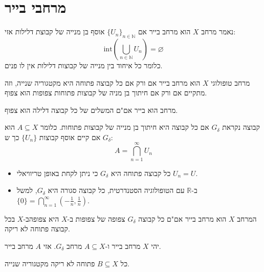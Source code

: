 \documentclass{tstextbook}
\begin{document}
\section{מרחבי בייר}

\begin{definition}
נאמר מרחב \(X\) הוא מרחב בייר אם  \(\{ U_{n} \}_{n \in \mathbb{N}}\) אוסף בן מנייה של קבוצת דלילות אזי:
$$\mathrm{int}\left( \bigcup_{n\in \mathbb{N}}U_{n} \right)=\varnothing $$
כלומר כל איחוד בין מנייה של קבוצות דלילות אין לו פנים.

\end{definition}
\begin{proposition}
מרחב טופולוגי \(X\) הוא מרחב בייר אם ורק אם כל קבוצה פתוחה היא מקטגוריה שנייה, וזה מתקיים אם ורק אם חיתוך בן מניה של קבוצות פתוחות צפופות הוא צפוף.

\end{proposition}
\begin{corollary}
מרחב הוא בייר אם"ם המשלים של כל קבוצה דלילה הוא צפוף.

\end{corollary}
\begin{definition}
קבוצה נקראת \(G_{\delta}\) אם כל קבוצה היא חיתוך בן מנייה של קבוצות פתוחות. כלומר \(A\subseteq X\) הוא \(G_{\delta}\) אם קיים אוסף קבוצות \(\{ U_{n} \}\) כך ש:
$$A=\bigcap_{n=1}^{\infty} U_{n}$$

\end{definition}
\begin{example}
  \begin{itemize}
    \item כל קבוצה פתוחה היא \(G_{\delta}\) כי ניתן לקחת באופן טריוויאלי \(U_{n}=U\).
    \item ב-\(\mathbb{R}\) עם הטופולוגיה הסטנדרטית, כל קבוצה סגורה היא \(G_{\delta}\), למשל \(\{ 0 \}=\bigcap_{n=1}^{\infty}\left( -\frac{1}{n},\frac{1}{n} \right)\).
  \end{itemize}
\end{example}
\begin{corollary}
המרחב \(X\) הוא מרחב בייר אם"ם כל קבוצה \(G_{\delta}\) צפופה של צפופות ב-\(X\) היא צפופהב-\(X\) בכל קבוצה פתוחה לא ריקה. 

\end{corollary}
\begin{proposition}
יהי \(X\) מרחב בייר ו-\(A\subseteq X\) מרחב \(G_{\delta}\). אזי \(A\) מרחב בייר.

\end{proposition}
\begin{proposition}
כל \(B\subseteq X\) פתוחה לא ריקה מקטגוריה שנייה.

\end{proposition}
\end{document}
